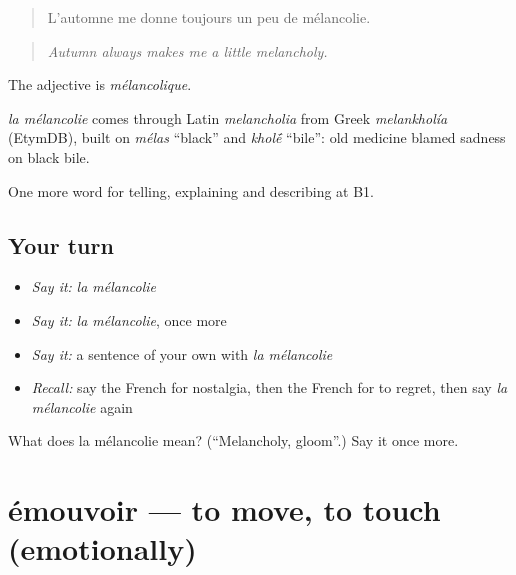 \begin{quote}
L'automne me donne toujours un peu de mélancolie.
\end{quote}

\begin{quote}
\emph{Autumn always makes me a little melancholy.}
\end{quote}

The adjective is \emph{mélancolique}.

\begin{cousinweb}
\emph{la mélancolie} comes through Latin \emph{melancholia} from Greek \emph{melankholía} (EtymDB), built on \emph{mélas} \textquotedblleft{}black\textquotedblright{} and \emph{khol\'{\={e}}} \textquotedblleft{}bile\textquotedblright{}: old medicine blamed sadness on black bile.
\end{cousinweb}

\begin{grammarlens}[title={What you've built}]
One more word for telling, explaining and describing at B1.
\end{grammarlens}

\subsection*{Your turn}
\begin{itemize}
\raggedright
  \item \emph{Say it:} \emph{la mélancolie}
  \item \emph{Say it:} \emph{la mélancolie}, once more
  \item \emph{Say it:} a sentence of your own with \emph{la mélancolie}
  \item \emph{Recall:} say the French for nostalgia, then the French for to regret, then say \emph{la mélancolie} again
\end{itemize}

\begin{tcolorbox}[breakable,colback=teal!4,colframe=teal!35!black,title={Before you move on}]
What does la mélancolie mean? (\textquotedblleft{}Melancholy, gloom\textquotedblright{}.) Say it once more.
\end{tcolorbox}
\section[émouvoir]{émouvoir — to move, to touch (emotionally)}

\label{lesson:FR-C472-emouvoir}



